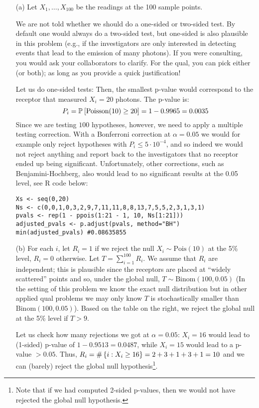 \begin{enumerate}
\item[(a)] Let $X_1, \dots, X_{100}$ be the readings at the 100 sample points. 

We are not told whether we should do a one-sided or two-sided test. By default one would always do a two-sided test, but one-sided is also plausible in this problem (e.g., if the investigators are only interested in detecting events that lead to the emission of many photons). If you were consulting, you would ask your collaborators to clarify. For the qual, you can pick either (or both); as long as you provide a quick justification!

Let us do one-sided tests: Then, the smallest p-value would correspond to the receptor that measured $X_i=20$ photons. The p-value is:
$$P_i = \mathbb{P}_{}\left[\text{Poisson}(10) \geq 20\right] = 1-0.9965 = 0.0035$$
Since we are testing $100$ hypotheses, however, we need to apply a multiple testing correction. With a Bonferroni correction at $\alpha=0.05$ we would for example only reject hypotheses with $P_i \leq 5 \cdot 10^{-4}$, and so indeed we would not reject anything and report back to the investigators that no receptor ended up being significant. Unfortunately, other corrections, such as Benjamini-Hochberg, also would lead to no significant results at the 0.05 level, see R code below:

\begin{verbatim}
Xs <- seq(0,20)
Ns <- c(0,0,1,0,3,2,9,7,11,11,8,8,13,7,5,5,2,3,1,3,1)
pvals <- rep(1 - ppois(1:21 - 1, 10, Ns[1:21]))
adjusted_pvals <- p.adjust(pvals, method="BH")
min(adjusted_pvals) #0.08635855
\end{verbatim}



\item[(b)] For each $i$, let $R_i = 1$ if we reject the null $X_i \sim \text{Pois}(10)$ at the 5\% level, $R_i = 0$ otherwise. Let $T = \displaystyle\sum_{i=1}^{100} R_i$. We assume that $R_i$ are independent; this is plausible since the receptors are placed at ``widely scattered'' points and so, under the global null, $T \sim \text{Binom}(100, 0.05)$ (In the setting of this problem we know the exact null distribution but in other applied qual problems we may only know $T$ is stochastically smaller than $\text{Binom}(100, 0.05)$). Based on the table on the right, we reject the global null at the 5\% level if $T > 9$.

Let us check how many rejections we got at $\alpha =0.05$: $X_i = 16$ would lead to (1-sided) p-value of $1-0.9513=0.0487$, while $X_i=15$ would lead to a p-value $>0.05$. Thus, $R_i = \#\left\{i: X_i \geq 16\right\} = 2 +3 + 1 + 3+ 1 = 10$ and we can (barely) reject the global null hypothesis\footnote{Note that if we had computed 2-sided p-values, then we would not have rejected the global null hypothesis.}.


\end{enumerate}

